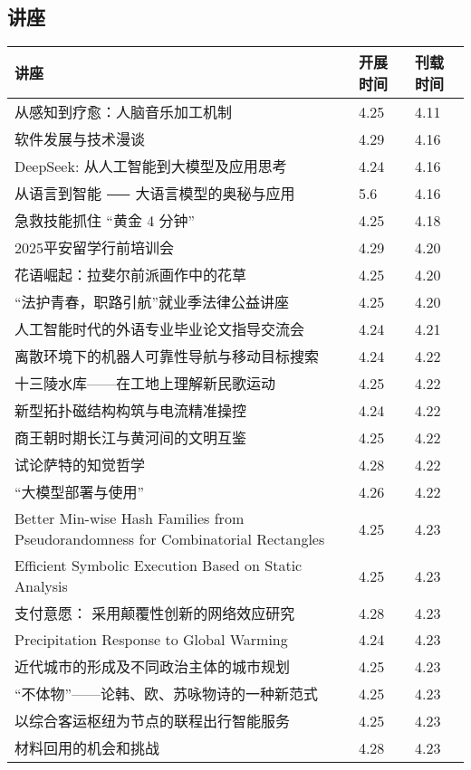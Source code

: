\documentclass[letterpaper, 12pt]{article}
\begin{document}
\begin{multicols}{2}
\pagebreak

\section{讲座}
\begin{tabular}{|>{\centering\arraybackslash}m{}|m{}|m{}|}
    \hline
    讲座 & 开展时间 & 刊载时间\\
    \hline\hline
    从感知到疗愈：人脑音乐加工机制 & 4.25 & 4.11\\\hline
    软件发展与技术漫谈 & 4.29 & 4.16\\\hline
    DeepSeek: 从人工智能到大模型及应用思考 & 4.24 & 4.16\\\hline
    从语言到智能 ⸺ 大语言模型的奥秘与应用 & 5.6 & 4.16\\\hline
    急救技能抓住 “黄金 4 分钟” & 4.25 & 4.18\\\hline
    2025平安留学行前培训会 & 4.29 & 4.20\\\hline
    花语崛起：拉斐尔前派画作中的花草 & 4.25 & 4.20\\\hline
    “法护青春，职路引航”就业季法律公益讲座 & 4.25 & 4.20\\\hline
    人工智能时代的外语专业毕业论文指导交流会 & 4.24 & 4.21\\\hline
    离散环境下的机器人可靠性导航与移动目标搜索 & 4.24 & 4.22\\\hline
    十三陵水库——在工地上理解新民歌运动 & 4.25 & 4.22\\\hline
    新型拓扑磁结构构筑与电流精准操控 & 4.24 & 4.22\\\hline
    商王朝时期长江与黄河间的文明互鉴 & 4.25 & 4.22\\\hline
    试论萨特的知觉哲学 & 4.28 & 4.22\\\hline
    “大模型部署与使用” & 4.26 & 4.22\\\hline
    Better Min-wise Hash Families from Pseudorandomness for Combinatorial Rectangles & 4.25 & 4.23\\\hline
    Efficient Symbolic Execution Based on Static Analysis & 4.25 & 4.23\\\hline
    支付意愿： 采用颠覆性创新的网络效应研究 & 4.28 & 4.23\\\hline
    Precipitation Response to Global Warming & 4.24 & 4.23\\\hline
    近代城市的形成及不同政治主体的城市规划 & 4.25 & 4.23\\\hline
    “不体物”——论韩、欧、苏咏物诗的一种新范式 & 4.25 & 4.23\\\hline
    以综合客运枢纽为节点的联程出行智能服务 & 4.25 & 4.23\\\hline
    材料回用的机会和挑战 & 4.28 & 4.23\\\hline
\end{tabular}

\end{multicols}
\end{document}
